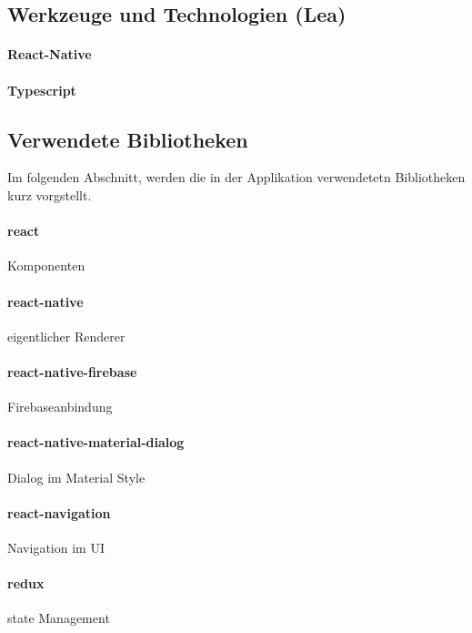 \subsection{Werkzeuge und Technologien (Lea)}
\paragraph{React-Native}



\paragraph{Typescript}
\subsection{Verwendete Bibliotheken}
Im folgenden Abschnitt, werden die in der Applikation verwendetetn Bibliotheken kurz vorgstellt.


\paragraph{react}
Komponenten
\paragraph{react-native}
eigentlicher Renderer

\paragraph{react-native-firebase}
Firebaseanbindung

\paragraph{react-native-material-dialog}
Dialog im Material Style

\paragraph{react-navigation}
Navigation im UI
\paragraph{redux}
state Management

